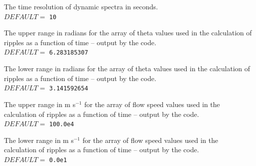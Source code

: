 \documentclass[12pt,a4paper]{article}
\begin{document}
    \parbox[t]{\temptextwidth}{The time resolution of dynamic spectra in seconds. \\ 
                               $DEFAULT=$ {\tt 10}}

  \vspace{0.5cm}

  \setlength{\temptextwidth}{\textwidth}  
  \addtolength{\temptextwidth}{-1.0\parindent} 
    
    \parbox[t]{\temptextwidth}{The upper range in radians for the array
                               of theta  values used in the calculation 
                               of ripples as a function of time -- 
                               output by the  code. \\ 
                               $DEFAULT=$ {\tt 6.283185307}}

  \vspace{0.5cm}

  \setlength{\temptextwidth}{\textwidth}  
  \addtolength{\temptextwidth}{-1.0\parindent} 
   
    \parbox[t]{\temptextwidth}{The lower range in radians for the array
                               of theta  values used in the calculation 
                               of ripples as a function of time -- 
                               output by the  code. \\ 
                               $DEFAULT=$ {\tt 3.141592654}}

  \vspace{0.5cm}

  \setlength{\temptextwidth}{\textwidth}  
  \addtolength{\temptextwidth}{-1.0\parindent} 
    
    \parbox[t]{\temptextwidth}{The upper range in m s$^{-1}$ for the array 
                               of flow speed values used in the calculation 
                               of ripples as a function of time -- 
                               output by the  code. \\ 
                               $DEFAULT=$ {\tt 100.0e4}}

  \vspace{0.5cm}

  \setlength{\temptextwidth}{\textwidth}  
  \addtolength{\temptextwidth}{-1.0\parindent} 
    
    \parbox[t]{\temptextwidth}{The lower range in m s$^{-1}$ for the array 
                               of flow speed values used in the calculation 
                               of ripples as a function of time -- 
                               output by the  code. \\ 
                               $DEFAULT=$ {\tt 0.0e1}}
\end{document}
